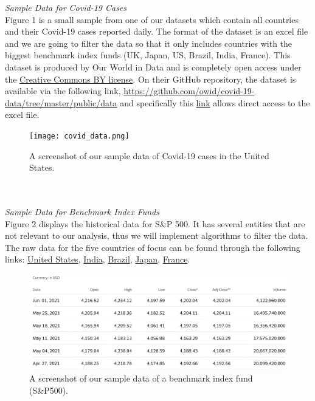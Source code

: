 \documentclass[fontsize=11pt]{article}
\begin{document}
\emph{Sample Data for Covid-19 Cases} \\
Figure 1 is a small sample from one of our datasets which contain all countries and their Covid-19 cases reported daily. The format of the dataset is an excel file and we are going to filter the data so that it only includes countries with the biggest benchmark index funds (UK, Japan, US, Brazil, India, France). This dataset is produced by Our World in Data and is completely open access under the 
\href{https://creativecommons.org/licenses/by/4.0/}{Creative Commons BY license}.
On their GitHub repository, the dataset is available via the following link, 
\href{https://github.com/owid/covid-19-data/tree/master/public/data}{https://github.com/owid/covid-19-data/tree/master/public/data} and specifically this
\href{https://covid.ourworldindata.org/data/owid-covid-data.xlsx}{link} allows direct access to the excel file.
\begin{figure}[htp]
    \centering
    \texttt{[image: covid\_data.png]}
    \caption{A screenshot of our sample data of Covid-19 cases in the United States.}
    \label{fig:stock}
\end{figure}
\\\\\emph{Sample Data for Benchmark Index Funds}\\
Figure 2 displays the historical data for S\&P 500. It has several entities that are not relevant to our analysis, thus we will implement algorithms to filter the data. The raw data for the five countries of focus can be found through the following links:
\href{https://ca.finance.yahoo.com/quote/\%5EGSPC/history?period1=1546387200&period2=1622592000&interval=1wk&filter=history&frequency=1wk&includeAdjustedClose=true}{United States}, 
\href{https://ca.finance.yahoo.com/quote/\%5EBSESN/history?period1=1546300800&period2=1622505600&interval=1wk&filter=history&frequency=1wk&}{India}, 
\href{https://finance.yahoo.com/quote/\%5EBVSP/history?period1=1546387200&period2=1622592000&interval=1wk&filter=history&frequency=1wk&includeAdjustedClose=true}{Brazil}, 
\href{https://ca.finance.yahoo.com/quote/\%5EN225/history?period1=1546300800&period2=1622505600&interval=1d&filter=history&frequency=1d&includeAdjustedClose=true}{Japan}, 
\href{https://finance.yahoo.com/quote/\%5EFCHI/history?period1=1546646400&period2=1622505600&interval=1wk&filter=history&frequency=1wk&includeAdjustedClose=true}{France}.

\begin{figure}[htp]
    \centering
    \includegraphics[width=14cm]{us_stock_data.png}
    \caption{A screenshot of our sample data of a benchmark index fund (S\&P500).}
    \label{fig:stock}
\end{figure}
\pagebreak
\end{document}
